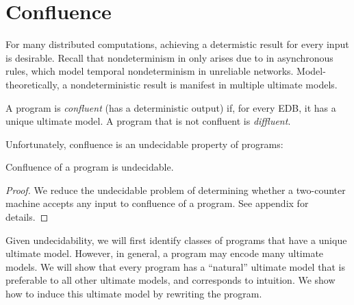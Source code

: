 \section{Confluence}

For many distributed computations, achieving a determistic result for every input is desirable.  Recall that nondeterminism in \lang only arises due to  in asynchronous rules, 
which model temporal nondeterminism in unreliable networks.
Model-theoretically, a nondeterministic result is manifest in multiple ultimate models.

\begin{definition}
A \lang program is {\em confluent} (has a deterministic output) if, for every EDB, it has a unique ultimate model.  A program that is not confluent is {\em diffluent}.
\end{definition}

Unfortunately, confluence is an undecidable property of \lang programs:

\begin{lemma}
\label{lem:confluence-undecidable}
Confluence of a \lang program is undecidable.
\end{lemma}
\begin{proof}
We reduce the undecidable problem of determining whether a two-counter machine accepts any input to confluence of a \lang program.  See appendix for details.
\end{proof}

Given undecidability, we will first identify classes of programs that have a unique ultimate model.  However, in general, a \lang program may encode many ultimate models.  We will show that every \lang program has a ``natural'' ultimate model that is preferable to all other ultimate models, and corresponds to intuition.  We show how to induce this ultimate model by rewriting the program.


